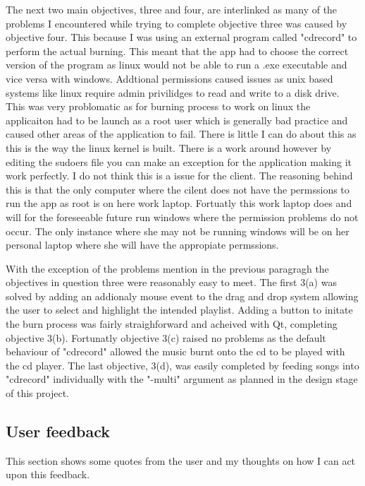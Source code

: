 \documentclass{article}
\begin{document}
The next two main objectives, three and four, are interlinked as many of the problems I encountered
while trying to complete objective three was caused by objective four. This because I was using an
external program called "cdrecord" to perform the actual burning. This meant that the app had to
choose the correct version of the program as linux would not be able to run a .exe executable and
vice versa with windows. Addtional permissions caused issues as unix based systems like linux require
admin privilidges to read and write to a disk drive. This was very problomatic as for burning process
to work on linux the applicaiton had to be launch as a root user which is generally bad practice and
caused other areas of the application to fail. There is little I can do about this as this is the way
the linux kernel is built. There is a work around however by editing the sudoers file you can make
an exception for the application making it work perfectly. I do not think this is a issue for the
client. The reasoning behind this is that the only computer where the cilent does not have the
permssions to run the app as root is on here work laptop. Fortuatly this work laptop does and will
for the foreseeable future run windows where the permission problems do not occur. The only instance
where she may not be running windows will be on her personal laptop where she will have the appropiate
permssions.

With the exception of the problems mention in the previous paragragh the objectives in question three
were reasonably easy to meet. The first 3(a) was solved by adding an addionaly mouse event to the
drag and drop system allowing the user to select and highlight the intended playlist. Adding
a button to initate the burn process was fairly straighforward and acheived with Qt, completing
objective 3(b). Fortunatly objective 3(c) raised no problems as the default behaviour of "cdrecord"
allowed the music burnt onto the cd to be played with the cd player. The last objective, 3(d), was
easily completed by feeding songs into "cdrecord" individually with the "-multi" argument as planned
in the design stage of this project.


\subsection{User feedback}
This section shows some quotes from the user and my thoughts on how I can act upon this feedback.
\end{document}
